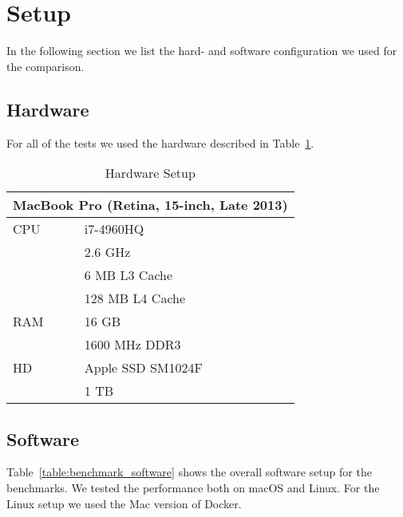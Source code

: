 \section{Setup}

In the following section we list the hard- and software configuration we used for the comparison.

\subsection{Hardware}

For all of the tests we used the hardware described in Table~\ref{table:benchmark_hardware}.

\begin{table}[H]
  \caption{Hardware Setup}
  \label{table:benchmark_hardware}
  \centering
  \begin{tabular}{ll}
\toprule
\multicolumn{2}{c}{MacBook Pro (Retina, 15-inch, Late 2013)}\\
\midrule
               CPU &            i7-4960HQ\\
                   &              2.6 GHz\\
                   &        6 MB L3 Cache\\
                   &      128 MB L4 Cache\\
               RAM &                16 GB\\
                   &        1600 MHz DDR3\\
                HD &    Apple SSD SM1024F\\
                   &                 1 TB\\
\bottomrule
  \end{tabular}
\end{table}

\subsection{Software}

Table~\ref{table:benchmark_software} shows the overall software setup for the benchmarks. We tested the performance both on macOS and Linux. For the Linux setup we used the Mac version of Docker.

